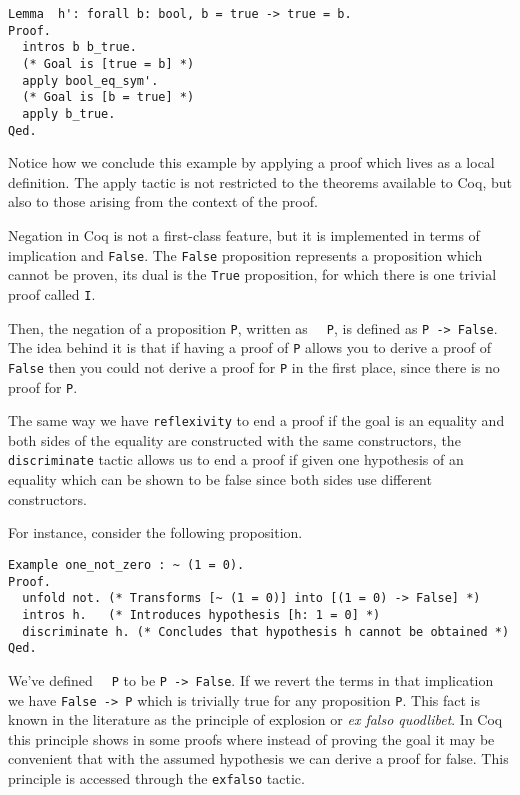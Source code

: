 \begin{verbatim}
Lemma  h': forall b: bool, b = true -> true = b.
Proof.
  intros b b_true.
  (* Goal is [true = b] *)
  apply bool_eq_sym'.
  (* Goal is [b = true] *)
  apply b_true.
Qed.
\end{verbatim}

Notice how we conclude this example by applying a proof which lives as a local definition. The apply 
tactic is not restricted to the theorems available to Coq, but also to those arising from the context
of the proof.

Negation in Coq is not a first-class feature, but it is implemented in terms of implication and 
\texttt{False}. The \texttt{False} proposition represents a proposition which cannot be
proven, its dual is the \texttt{True} proposition, for which there is one trivial proof called
\texttt{I}.

Then, the negation of a proposition \texttt{P}, written as \texttt{~ P}, is defined as
\texttt{P -> False}. The idea behind it is that if having a proof of \texttt{P} allows
you to derive a proof of \texttt{False} then you could not derive a proof for \texttt{P}
in the first place, since there is no proof for \texttt{P}.

The same way we have \texttt{reflexivity} to end a proof if the goal is an equality and both
sides of the equality are constructed with the same constructors, the \texttt{discriminate}
tactic allows us to end a proof if given one hypothesis of an equality which can be shown to be false
since both sides use different constructors.

For instance, consider the following proposition.
\begin{verbatim}
Example one_not_zero : ~ (1 = 0).
Proof.
  unfold not. (* Transforms [~ (1 = 0)] into [(1 = 0) -> False] *)
  intros h.   (* Introduces hypothesis [h: 1 = 0] *)
  discriminate h. (* Concludes that hypothesis h cannot be obtained *)
Qed.
\end{verbatim}

We've defined \texttt{~ P} to be \texttt{P -> False}. If we revert the terms in that implication we have
\texttt{False -> P} which is trivially true for any proposition \texttt{P}. This fact is known in the literature
as the principle of explosion or \emph{ex falso quodlibet}. In Coq this principle shows in some proofs
where instead of proving the goal it may be convenient that with the assumed hypothesis we can derive
a proof for false. This principle is accessed through the \texttt{exfalso} tactic.

